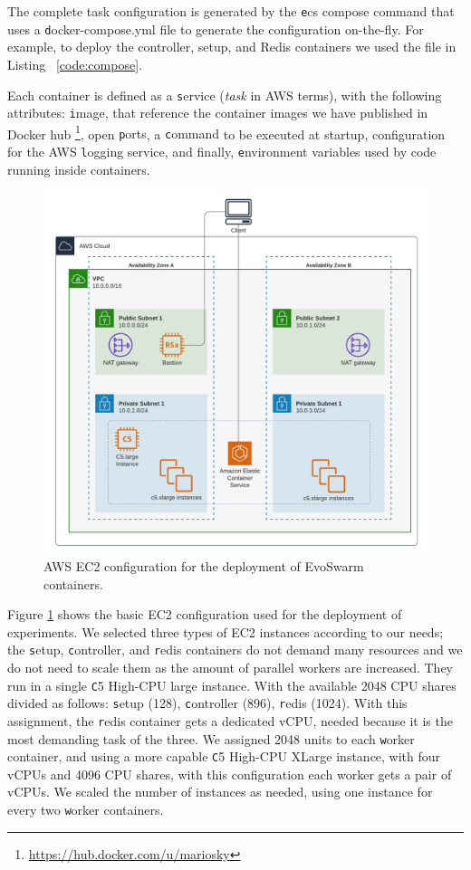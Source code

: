 \documentclass[review]{elsarticle}
\begin{document}
The complete task configuration is generated by the {\texttt ecs compose command} that uses a {\texttt docker-compose.yml} file to generate 
the configuration on-the-fly. For example, to deploy the controller, setup, and Redis 
containers we used the file in Listing ~\ref{code:compose}.

Each container is defined as a {\texttt service} ({\em task} in AWS terms), with the following attributes: {\texttt image},
that reference the container images we have published in Docker hub
\footnote{\url{https://hub.docker.com/u/mariosky}}, open {\texttt ports}, a {\texttt command} to be executed at
startup, configuration for the AWS {\texttt logging} service, and finally, {\texttt environment}
variables used by code running inside containers.

\begin{figure}[h!tbp]
  \centering
  \includegraphics[width=\textwidth]{aws_ec2}
  \caption{AWS EC2 configuration for the deployment of EvoSwarm containers.
  }
  \label{fig:aws-configuration}
\end{figure}

Figure \ref{fig:aws-configuration} shows the basic EC2 configuration
used for the deployment of experiments. We selected three types of EC2
instances according to our needs; the {\texttt setup}, {\texttt
controller}, and {\texttt redis} containers do not demand many
resources and we do not need to scale them as the amount of parallel
workers are increased. They run in a single {\texttt C5 High-CPU
large} instance. With the available 2048 CPU shares divided as
follows: {\texttt setup} (128), {\texttt controller} (896), {\texttt
redis} (1024). With this assignment, the {\texttt redis} container
gets a dedicated vCPU, needed because it is the most demanding task of
the three. We assigned 2048 units to each {\texttt worker} container,
and using a more capable {\texttt C5 High-CPU XLarge} instance, with
four vCPUs and 4096 CPU shares, with this configuration each worker
gets a pair of vCPUs.  We scaled the number of instances as needed,
using one instance for every two {\texttt worker} containers.
\end{document}
